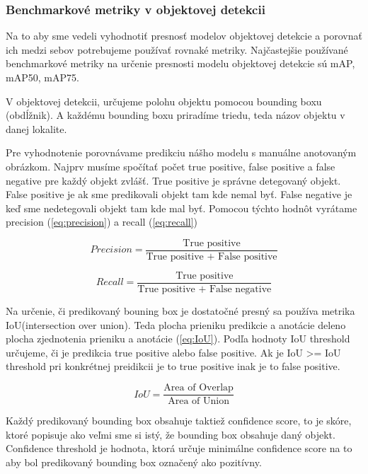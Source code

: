 \subsubsection{Benchmarkové metriky v objektovej detekcii}

Na to aby sme vedeli vyhodnotiť presnosť modelov objektovej detekcie a porovnať ich medzi sebov potrebujeme používať rovnaké metriky. Najčastejšie používané benchmarkové metriky na určenie presnosti modelu objektovej detekcie sú mAP, mAP50, mAP75.

V objektovej detekcii, určujeme polohu objektu pomocou bounding boxu (obdĺžnik). A každému bounding boxu priradíme triedu, teda názov objektu v danej lokalite. 

Pre vyhodnotenie porovnávame predikciu nášho modelu s manuálne anotovaným obrázkom. Najprv musíme spočítať počet true positive, false positive a false negative pre každý objekt zvlášť. True positive je správne detegovaný objekt. False positive je ak sme predikovali objekt tam kde nemal byť. False negative je keď sme nedetegovali objekt tam kde mal byť. Pomocou týchto hodnôt vyrátame precision (\ref{eq:precision}) a recall (\ref{eq:recall})

\begin{equation}
Precision = \frac{\text{True positive}}{\text{True positive + False positive}} \label{eq:precision}
\end{equation}

\begin{equation}
Recall = \frac{\text{True positive}}{\text{True positive + False negative}} \label{eq:recall}
\end{equation}

Na určenie, či predikovaný bouning box je dostatočné presný sa používa metrika IoU(intersection over union). Teda plocha prieniku predikcie a anotácie deleno plocha zjednotenia prieniku a anotácie (\ref{eq:IoU}). Podľa hodnoty IoU threshold určujeme, či je predikcia true positive alebo false positive. Ak je IoU >= IoU threshold pri konkrétnej preidikcii je to true positive inak je to false positive. 

\begin{equation}
IoU = \frac{\text{Area of Overlap}}{\text{Area of Union}} \label{eq:IoU}
\end{equation}

Každý predikovaný bounding box obsahuje taktiež confidence score, to je skóre, ktoré popisuje ako veľmi sme si istý, že bounding box obsahuje daný objekt. Confidence threshold je hodnota, ktorá určuje minimálne confidence score na to aby bol predikovaný bounding box označený ako pozitívny. 

